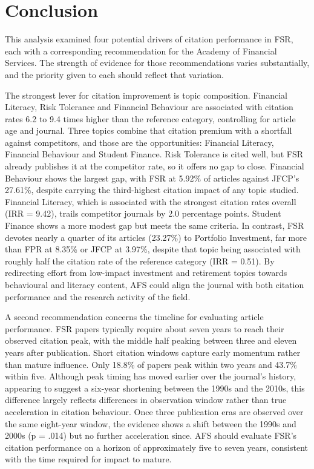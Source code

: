 \documentclass[11pt,a4paper]{article}
\begin{document}
\section{Conclusion}\label{conclusion}

This analysis examined four potential drivers of citation performance in FSR, each with a corresponding recommendation for the Academy of Financial Services. The strength of evidence for those recommendations varies substantially, and the priority given to each should reflect that variation.

The strongest lever for citation improvement is topic composition. Financial Literacy, Risk Tolerance and Financial Behaviour are associated with citation rates 6.2 to 9.4 times higher than the reference category, controlling for article age and journal. Three topics combine that citation premium with a shortfall against competitors, and those are the opportunities: Financial Literacy, Financial Behaviour and Student Finance. Risk Tolerance is cited well, but FSR already publishes it at the competitor rate, so it offers no gap to close. Financial Behaviour shows the largest gap, with FSR at 5.92\% of articles against JFCP's 27.61\%, despite carrying the third-highest citation impact of any topic studied. Financial Literacy, which is associated with the strongest citation rates overall (IRR = 9.42), trails competitor journals by 2.0 percentage points. Student Finance shows a more modest gap but meets the same criteria. In contrast, FSR devotes nearly a quarter of its articles (23.27\%) to Portfolio Investment, far more than FPR at 8.35\% or JFCP at 3.97\%, despite that topic being associated with roughly half the citation rate of the reference category (IRR = 0.51). By redirecting effort from low-impact investment and retirement topics towards behavioural and literacy content, AFS could align the journal with both citation performance and the research activity of the field.

A second recommendation concerns the timeline for evaluating article performance. FSR papers typically require about seven years to reach their observed citation peak, with the middle half peaking between three and eleven years after publication. Short citation windows capture early momentum rather than mature influence. Only 18.8\% of papers peak within two years and 43.7\% within five. Although peak timing has moved earlier over the journal's history, appearing to suggest a six-year shortening between the 1990s and the 2010s, this difference largely reflects differences in observation window rather than true acceleration in citation behaviour. Once three publication eras are observed over the same eight-year window, the evidence shows a shift between the 1990s and 2000s (p = .014) but no further acceleration since. AFS should evaluate FSR's citation performance on a horizon of approximately five to seven years, consistent with the time required for impact to mature.
\end{document}
